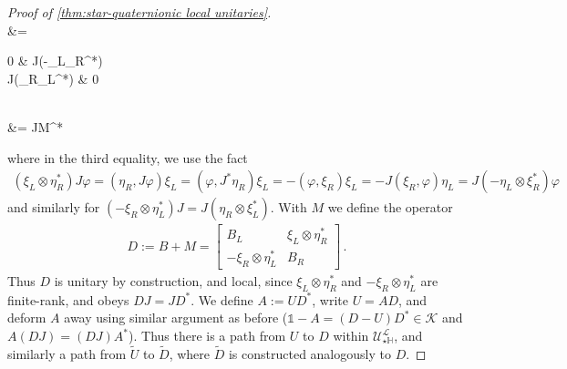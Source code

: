 \documentclass[a4paper,10pt]{article}
\numberwithin{equation}{section}
\theoremstyle{plain}
\theoremstyle{plain}
\theoremstyle{plain}
\theoremstyle{plain}
\theoremstyle{plain}
\theoremstyle{remark}
\theoremstyle{definition}
\theoremstyle{plain}
\newcommand{\calU}{\mathcal{U}}
\newcommand{\calK}{\mathcal{K}}
\newcommand{\calL}{\mathcal{L}}
\newcommand{\ti}[1]{\widetilde{#1}}
\newcommand{\vf}{\varphi}
\newcommand{\Id}{\mathds{1}}
\newcommand{\HH}{\mathbb{H}}
\newcommand{\eq}[1]{\begin{align*}#1\end{align*}}
\newcommand{\eql}[1]{\begin{align}#1\end{align}}
\begin{document}
\begin{proof}[Proof of \cref{thm:star-quaternionic local unitaries}]
{			\\ &=\begin{bmatrix}0 & J(-\eta_L\otimes \xi_R^*) \\ J(\eta_R\otimes \xi_L^*) & 0\end{bmatrix} 
			\\ &= JM^*} 
		where in the third equality, we use the fact \eq{(\xi_L\otimes \eta_R^*) J\vf= (\eta_R,J \vf)\xi_L=(\vf,J^*\eta_R)\xi_L=-(\vf,\xi_R)\xi_L=-J(\xi_R,\vf)\eta_L=J(-\eta_L\otimes\xi_R^*)\vf } and similarly for $(-\xi_R\otimes \eta_L^*)J=J(\eta_R\otimes \xi_L^*).$
		With $M$ we define the operator \eql{D:=B+M=\begin{bmatrix}B_{L} & \xi_L\otimes \eta_R^* \\ -\xi_R \otimes \eta_L^* & B_{R}\end{bmatrix}\label{eq:B with off-diagonal entries}\,.} Thus $D$ is unitary by construction, and local, since $\xi_L\otimes \eta_R^*$ and $-\xi_R \otimes \eta_L^*$ are finite-rank, and obeys $DJ=JD^\ast$. 
		We define $A:=UD^*$, write $U=AD$, and deform $A$ away using similar argument as before ($\Id-A= (D-U)D^\ast\in\calK$ and $A(DJ)=(DJ)A^\ast$). Thus there is a path from $U$ to $D$ within $\calU^\calL_{\star\HH}$, and similarly a path from $\ti U$ to $\ti{D}$, where $\ti{D}$ is constructed analogously to $D.$
		

\end{proof}
\end{document}
